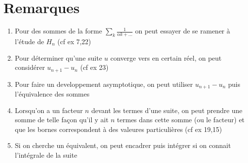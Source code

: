 \documentclass[fleqn]{article}
\theoremstyle{definition} \newtheorem*{defi}{D\'efinition}
\theoremstyle{definition} \newtheorem*{theo}{Th\'eor\`eme}
\theoremstyle{definition} \newtheorem*{coro}{Corollaire}
\theoremstyle{remark} \newtheorem*{rqs}{Remarques}
\theoremstyle{definition} \newtheorem*{prop}{Propri\'et\'e}
\begin{document}
\section{Remarques}
\begin{enumerate}
	\item Pour des sommes de la forme $\sum_k \frac{1}{\alpha k + \hdots}$ on peut essayer de se ramener \`a l'\'etude de $H_n$ (cf ex 7,22)
	\item Pour d\'eterminer qu'une suite $u$ converge vers en certain r\'eel, on peut consid\'erer $u_{n+1} - u_n$ (cf ex 23)
	\item Pour faire un developpement asymptotique, on peut utiliser $u_{n+1} - u_n$ puis l'\'equivalence des sommes
	\item Lorsqu'on a un facteur $n$ devant les termes d'une suite, on peut prendre une somme de telle fa\c{c}on qu'il y ait $n$ termes dans cette
		somme (ou le facteur) et que les bornes correspondent \`a des valeures particuli\`eres (cf ex 19,15)
	\item Si on cherche un \'equivalent, on peut encadrer puis int\'egrer si on connait l'int\'egrale de la suite
\end{enumerate}
\end{document}
